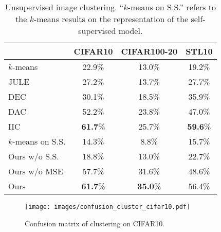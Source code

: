 \begin{table}[htb]
\centering
\footnotesize
\caption{Unsupervised image clustering. ``$k$-means on S.S.'' refers to the $k$-means results on the representation of the self-supervised model.}\label{tab:clustering}
\begin{tabular}{lccc}
\toprule{}
& CIFAR10 & CIFAR100-20 & STL10  \\
\midrule
$k$-means~\cite{MackQueen67_Kmeans} &22.9\%  &13.0\% &19.2\% \\
JULE~\cite{yang2016joint} & 27.2\% &13.7\% & 27.7\% \\
DEC~\cite{Xie16_DEC} & 30.1\% &18.5\% & 35.9\% \\
DAC~\cite{Chang_2018_DAC} & 52.2\%  &23.8\% & 47.0\% \\
IIC~\cite{ji2019invariant} &  \textbf{61.7}\%  &25.7\% & \textbf{59.6}\% \\
\midrule
$k$-means on S.S. & 14.3\% & 8.8\% & 15.7\% \\
\midrule
Ours w/o S.S. & 18.8\%  & 13.0\% &  22.7\% \\
Ours w/o MSE &  57.7\%  & 31.6\% &  48.6\% \\
Ours & \textbf{61.7}\%  &\textbf{35.0}\% & 56.4\% \\
\bottomrule
\end{tabular}
\end{table}

\begin{figure}
\centering
\texttt{[image: images/confusion\_cluster\_cifar10.pdf]}
\caption{Confusion matrix of clustering on CIFAR10.}\label{fig:cm_cluster}
\end{figure}

